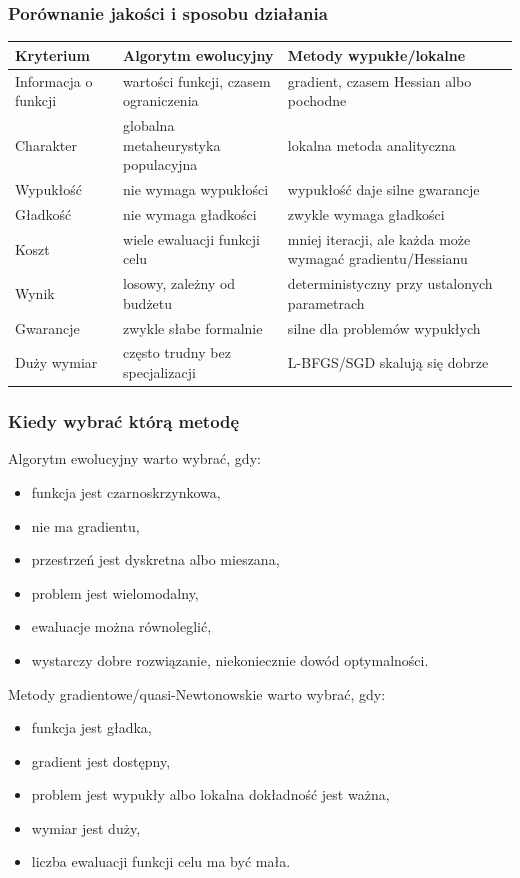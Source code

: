 \subsubsection{Porównanie jakości i sposobu działania}

\begin{longtable}{p{}p{}p{}}
\toprule
Kryterium & Algorytm ewolucyjny & Metody wypukłe/lokalne \\
\midrule
Informacja o funkcji & wartości funkcji, czasem ograniczenia & gradient, czasem Hessian albo pochodne \\
Charakter & globalna metaheurystyka populacyjna & lokalna metoda analityczna \\
Wypukłość & nie wymaga wypukłości & wypukłość daje silne gwarancje \\
Gładkość & nie wymaga gładkości & zwykle wymaga gładkości \\
Koszt & wiele ewaluacji funkcji celu & mniej iteracji, ale każda może wymagać gradientu/Hessianu \\
Wynik & losowy, zależny od budżetu & deterministyczny przy ustalonych parametrach \\
Gwarancje & zwykle słabe formalnie & silne dla problemów wypukłych \\
Duży wymiar & często trudny bez specjalizacji & L-BFGS/SGD skalują się dobrze \\
\bottomrule
\end{longtable}

\subsubsection{Kiedy wybrać którą metodę}

Algorytm ewolucyjny warto wybrać, gdy:
\begin{itemize}
  \item funkcja jest czarnoskrzynkowa,
  \item nie ma gradientu,
  \item przestrzeń jest dyskretna albo mieszana,
  \item problem jest wielomodalny,
  \item ewaluacje można równoleglić,
  \item wystarczy dobre rozwiązanie, niekoniecznie dowód optymalności.
\end{itemize}

Metody gradientowe/quasi-Newtonowskie warto wybrać, gdy:
\begin{itemize}
  \item funkcja jest gładka,
  \item gradient jest dostępny,
  \item problem jest wypukły albo lokalna dokładność jest ważna,
  \item wymiar jest duży,
  \item liczba ewaluacji funkcji celu ma być mała.
\end{itemize}

